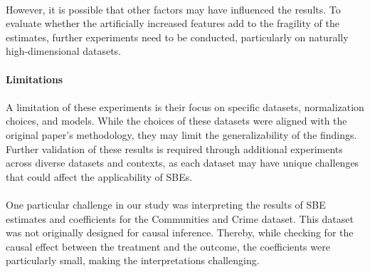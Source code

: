 \\
However, it is possible that other factors may have influenced the results. To evaluate whether the artificially increased features add to the fragility of the estimates, further experiments need to be conducted, particularly on naturally high-dimensional datasets. \\
\\
{\large\textbf{Limitations}}\\
\\
A limitation of these experiments is their focus on specific datasets, normalization choices, and models. While the choices of these datasets were aligned with the original paper's methodology, they may limit the generalizability of the findings. Further validation of these results is required through additional experiments across diverse datasets and contexts, as each dataset may have unique challenges that could affect the applicability of SBEs. \\
\\
One particular challenge in our study was interpreting the results of SBE estimates and coefficients for the Communities and Crime dataset. This dataset was not originally designed for causal inference. Thereby, while checking for the causal effect between the treatment and the outcome, the coefficients were particularly small, making the interpretations challenging.